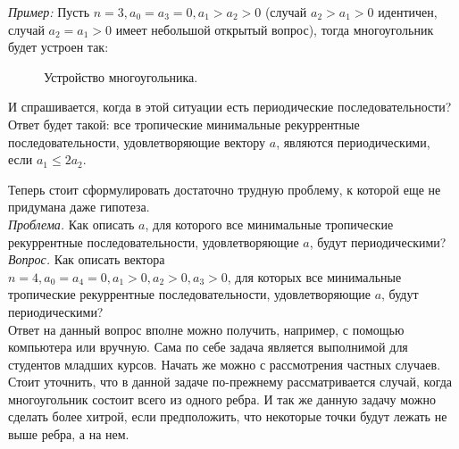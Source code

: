 \documentclass[russian]{lecture-notes}
\begin{document}
\emph{Пример:}
\noindent Пусть $n=3, a_0 = a_3 = 0, a_1 > a_2 > 0$ (случай $a_2>a_1>0$ идентичен, случай $a_2=a_1>0$ имеет небольшой открытый вопрос), тогда многоугольник будет устроен так:

\begin{figure}[h]
\caption{Устройство многоугольника.}
\end{figure}

И спрашивается, когда в этой ситуации есть периодические последовательности? Ответ будет такой: все тропические минимальные рекуррентные последовательности, удовлетворяющие вектору $a$, являются периодическими, если $a_1 \le 2a_2$.

Теперь стоит сформулировать достаточно трудную проблему, к которой еще не придумана даже гипотеза. \\

\emph{Проблема.}
Как описать $a$, для которого все минимальные тропические рекуррентные последовательности, удовлетворяющие $a$, будут периодическими?\\


\emph{ Вопрос.}
Как описать вектора\\
$n=4, a_0=a_4=0, a_1>0, a_2>0, a_3>0$, для которых все минимальные тропические рекуррентные последовательности, удовлетворяющие $a$, будут периодическими?\\

Ответ на данный вопрос вполне можно получить, например, с помощью компьютера или вручную. Сама по себе задача является выполнимой для студентов младших курсов. Начать же можно с рассмотрения частных случаев. \\

Стоит уточнить, что в данной задаче по-прежнему рассматривается случай, когда многоугольник состоит всего из одного ребра. И так же данную задачу можно сделать более хитрой, если предположить, что некоторые точки будут лежать не выше ребра, а на нем.
\end{document}
